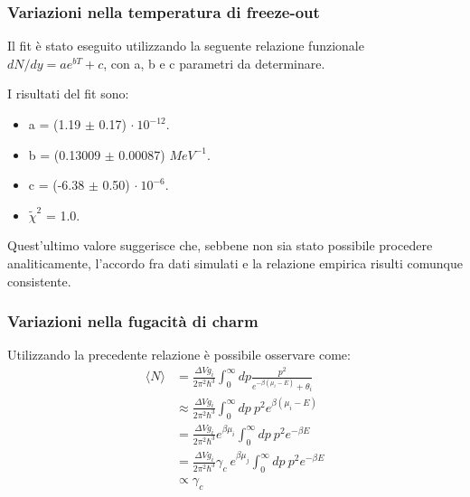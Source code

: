 \documentclass[11pt]{beamer}
\begin{document}
	
	\begin{frame}
		\frametitle{Variazioni nella temperatura di freeze-out}
		
		Il fit è stato eseguito utilizzando la seguente relazione funzionale 
		$dN/dy = a e^{bT} + c$, con a, b e c parametri da determinare. 
		
		I risultati del fit sono:
		
		\begin{itemize}
			\item a = (1.19 $\pm$ 0.17) $\cdot \ 10^{-12}$.
			\item b = (0.13009 $\pm$ 0.00087) $MeV^{-1}$.
			\item c = (-6.38 $\pm$ 0.50) $\cdot \ 10^{-6}$.
			\item $\tilde{\chi}^2$ = 1.0.
		\end{itemize}
		
		Quest'ultimo valore suggerisce che, sebbene non sia stato possibile procedere analiticamente, l'accordo fra dati simulati e la relazione empirica risulti comunque consistente.
		
	\end{frame}
	
	\begin{frame}
		\frametitle{Variazioni nella fugacità di charm}
		Utilizzando la precedente relazione è possibile osservare come:
		\begin{equation}
			\begin{aligned}
				\langle N \rangle &= \frac{\Delta V g_i}{2\pi^2\hbar^3} 
				\int_{0}^{\infty} dp 
				\frac{p^2}{e^{-\beta(\mu_i-E)}+\theta_i} \\
				&\approx \frac{\Delta V g_i}{2\pi^2\hbar^3} 
				\int_{0}^{\infty} dp \ p^2 e^{\beta(\mu_i-E)} \\
				&= \frac{\Delta V g_i}{2\pi^2\hbar^3} e^{\beta \mu_i} 
				\int_{0}^{\infty} dp \ p^2 e^{-\beta E} \\
				&= \frac{\Delta V g_i}{2\pi^2\hbar^3} \gamma_c \ e^{\beta \mu_j}
				\int_{0}^{\infty} dp \ p^2 e^{-\beta E}\\
				&\propto \gamma_c
			\end{aligned}
		\end{equation} 
	\end{frame}
	
\end{document}
